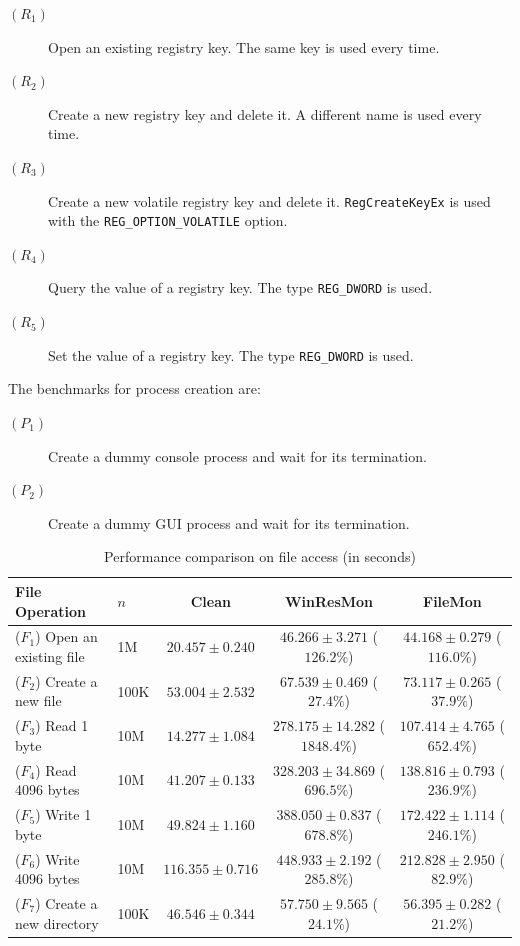 \begin{description}
\item[$(R_1)$] Open an existing registry key.  The same key is used every time.
\item[$(R_2)$] Create a new registry key and delete it.  A different name is
used every time. 
\item[$(R_3)$] Create a new volatile registry key and delete it.
{\small\tt RegCreateKeyEx} is used with the {\small\tt REG\_OPTION\_VOLATILE} option.
\item[$(R_4)$] Query the value of a registry key.  The type {\small\tt REG\_DWORD}
is used. 
\item[$(R_5)$] Set the value of a registry key.  The type {\small\tt REG\_DWORD} is
used. 
\end{description}

The benchmarks for process creation are:

\begin{description}
\item[$(P_1)$] Create a dummy console process and wait for its termination.
\item[$(P_2)$] Create a dummy GUI process and wait for its termination.
\end{description}

\begin{table}
\small
\centering
\begin{tabular}{|l|l|c|c|c|}
\hline
File Operation & $n$ & Clean & WinResMon & FileMon \\
\hline
($F_1$) Open an existing file  & 1M   & $20.457 \pm 0.240$  & $46.266 \pm 3.271$ ($126.2\%$)    & $44.168 \pm 0.279$ ($116.0\%$)\\
($F_2$) Create a new file      & 100K & $53.004 \pm 2.532$  & $67.539 \pm 0.469$ ($27.4\%$)     & $73.117 \pm 0.265$ ($37.9\%$) \\
($F_3$) Read 1 byte            & 10M  & $14.277 \pm 1.084$  & $278.175 \pm 14.282$ ($1848.4\%$) & $107.414 \pm 4.765$ ($652.4\%$) \\
($F_4$) Read 4096 bytes        & 10M  & $41.207 \pm 0.133$  & $328.203 \pm 34.869$ ($696.5\%$)  & $138.816 \pm 0.793$ ($236.9\%$) \\
($F_5$) Write 1 byte           & 10M  & $49.824 \pm 1.160$  & $388.050 \pm 0.837$ ($678.8\%$)   & $172.422 \pm 1.114$ ($246.1\%$) \\
($F_6$) Write 4096 bytes       & 10M  & $116.355 \pm 0.716$ & $448.933 \pm 2.192$ ($285.8\%$)   & $212.828 \pm 2.950$ ($82.9\%$) \\
($F_7$) Create a new directory & 100K & $46.546 \pm 0.344$  & $57.750 \pm 9.565$ ($24.1\%$)     & $56.395 \pm 0.282$ ($21.2\%$) \\
\hline
\end{tabular}
\caption{Performance comparison on file access (in seconds)}
\label{perf-file}
\end{table}


